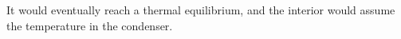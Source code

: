 It would eventually reach a thermal equilibrium, and the interior would assume the temperature in the condenser.